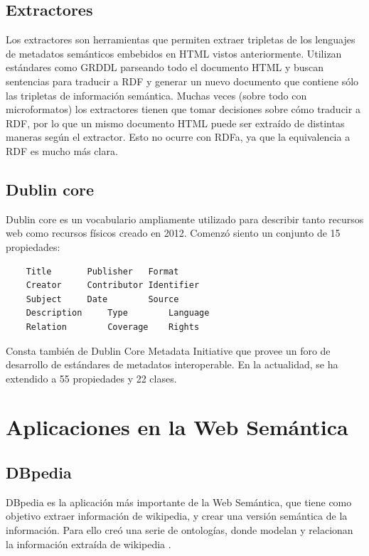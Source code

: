 \subsection{Extractores}

Los extractores son herramientas que permiten extraer tripletas de los lenguajes de metadatos semánticos embebidos en HTML vistos anteriormente. 
Utilizan estándares como GRDDL\cite{Connolly2007} parseando todo el documento HTML y buscan sentencias para traducir a RDF y generar un nuevo documento 
que contiene sólo las tripletas de información semántica. 
Muchas veces (sobre todo con microformatos) los extractores tienen que tomar decisiones sobre cómo traducir a RDF, por lo que 
un mismo documento HTML puede ser extraído de distintas maneras según el extractor. Esto no ocurre con RDFa, ya que la equivalencia a RDF es mucho 
más clara.

\subsection{Dublin core}

Dublin core \cite{DublinCore} es un vocabulario ampliamente utilizado para describir tanto recursos web como recursos físicos creado en 2012. Comenzó siento un conjunto de 15 
propiedades: 

\begin{lstlisting}
    Title		Publisher	Format
    Creator		Contributor	Identifier
    Subject		Date		Source
    Description		Type		Language
    Relation		Coverage	Rights
\end{lstlisting}



Consta también de Dublin Core Metadata Initiative que provee un foro de desarrollo de estándares de metadatos interoperable.
En la actualidad, se ha extendido a 55 propiedades y 22 clases.



\section{Aplicaciones en la Web Semántica}

\subsection{DBpedia}

DBpedia es la aplicación más importante de la Web Semántica, que tiene como objetivo extraer información de wikipedia, y crear una versión semántica 
de la información. Para ello creó una serie de ontologías, donde modelan y relacionan la información extraída de wikipedia \cite{dbpedia-swj}.

